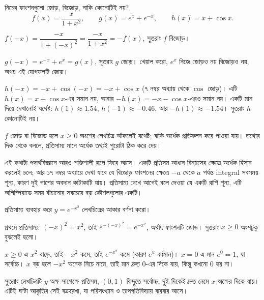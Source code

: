 \documentclass[11pt]{article}
\begin{document}
\begin{example}
নিচের ফাংশনগুলো জোড়, বিজোড়, নাকি কোনোটিই নয়?
\[
  f(x) = \frac{x}{1+x^{2}}, \qquad
  g(x) = e^{x} + e^{-x}, \qquad
  h(x) = x + \cos x .
\]
\end{example}

\begin{solbox}
$f(-x) = \dfrac{-x}{1+(-x)^{2}} = \dfrac{-x}{1+x^{2}} = -f(x)$, সুতরাং $f$
বিজোড়।

$g(-x) = e^{-x} + e^{x} = g(x)$, সুতরাং $g$ জোড়। খেয়াল করো, $e^{x}$ নিজে জোড়ও
নয় বিজোড়ও নয়, অথচ এই যোগফলটি জোড়।

$h(-x) = -x + \cos(-x) = -x + \cos x$ (৭ নম্বর অধ্যায় থেকে $\cos$ জোড়)।
এটি $h(x) = x + \cos x$-এর সমান নয়, আবার $-h(x) = -x - \cos x$-এরও সমান নয়।
একটি মান দিয়ে দেখানোই যথেষ্ট: $h(1) \approx 1.54$, $h(-1) \approx -0.46$,
আর $-h(1) \approx -1.54$। সুতরাং $h$ কোনোটিই নয়।
\end{solbox}

\begin{idea}[প্রতিসাম্য কাজ কমায়]
$f$ জোড় বা বিজোড় হলে $x \geq 0$ অংশের লেখচিত্র আঁকলেই যথেষ্ট; বাকি অর্ধেক
প্রতিফলন করে পাওয়া যায়। তথ্যের দিক থেকে বললে, প্রতিসাম্য মানে অর্ধেক তথ্যই
পুরোটা ঠিক করে দেয়।
\end{idea}

এই কথাটা পদার্থবিজ্ঞানে আরও শক্তিশালী রূপে ফিরে আসে। একটি প্রতিসম আধান বিন্যাসের
ক্ষেত্রে অর্ধেক হিসাব করলেই চলে; আর ১৭ নম্বর অধ্যায়ে দেখা যাবে যে বিজোড়
ফাংশনের ক্ষেত্রে $-a$ থেকে $a$ পর্যন্ত integral সবসময় শূন্য, কারণ দুই পাশের
অবদান কাটাকাটি যায়। প্রতিসাম্য দেখে আগেই বলে দেওয়া যে একটি রাশি শূন্য, এটি
অলিম্পিয়াডে সময় বাঁচানোর সবচেয়ে বড় কৌশলগুলোর একটি।

\begin{example}
প্রতিসাম্য ব্যবহার করে $y = e^{-x^{2}}$ লেখচিত্রের আকার বর্ণনা করো।
\end{example}

\begin{solbox}
প্রথমে প্রতিসাম্য: $(-x)^{2} = x^{2}$, তাই $e^{-(-x)^{2}} = e^{-x^{2}}$, অর্থাৎ
ফাংশনটি জোড়। সুতরাং $x \geq 0$ অংশটুকু বুঝলেই হলো।

$x \geq 0$-এ $x^{2}$ বাড়ে, তাই $-x^{2}$ কমে, তাই $e^{-x^{2}}$ কমে (কারণ
$e^{u}$ বর্ধমান)। $x = 0$-এ মান $e^{0} = 1$, যা সর্বোচ্চ। $x$ বড় হলে $-x^{2}$
অনেক নিচে নামে, তাই মান দ্রুত $0$-এর দিকে যায়, কিন্তু কখনো $0$ হয় না।

সুতরাং লেখচিত্রটি $y$-অক্ষ সাপেক্ষে প্রতিসম, $(0,1)$ বিন্দুতে সর্বোচ্চ, দুই
দিকেই দ্রুত নেমে $x$-অক্ষের দিকে যায়। এটিই ঘণ্টা আকৃতির সেই বক্ররেখা, যা
পরিসংখ্যান ও তাপগতিবিদ্যায় বারবার আসে।
\end{solbox}
\end{document}
